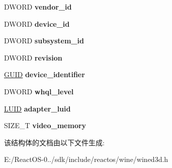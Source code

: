 \begin{DoxyCompactItemize}
D\+W\+O\+RD {\bfseries vendor\+\_\+id}
\item 
\mbox{\label{structwined3d__adapter__identifier_a71bece174e00a4526799496f315d3ec4}} 
D\+W\+O\+RD {\bfseries device\+\_\+id}
\item 
\mbox{\label{structwined3d__adapter__identifier_a318c346b7f25fed53d7fb9df3f8360db}} 
D\+W\+O\+RD {\bfseries subsystem\+\_\+id}
\item 
\mbox{\label{structwined3d__adapter__identifier_a23b2c2e2d8468787402d85a5cbe7528a}} 
D\+W\+O\+RD {\bfseries revision}
\item 
\mbox{\label{structwined3d__adapter__identifier_a7c235a252178acacd7e60780087a8e6c}} 
\hyperlink{interface_g_u_i_d}{G\+U\+ID} {\bfseries device\+\_\+identifier}
\item 
\mbox{\label{structwined3d__adapter__identifier_afbba093b8ffcb9bd786444d5d75ff2e2}} 
D\+W\+O\+RD {\bfseries whql\+\_\+level}
\item 
\mbox{\label{structwined3d__adapter__identifier_a78a8b9287342c268c407a32bc8f8028a}} 
\hyperlink{struct___l_u_i_d}{L\+U\+ID} {\bfseries adapter\+\_\+luid}
\item 
\mbox{\label{structwined3d__adapter__identifier_a92de5a1ba8c5561165215844432b0008}} 
S\+I\+Z\+E\+\_\+T {\bfseries video\+\_\+memory}
\end{DoxyCompactItemize}


该结构体的文档由以下文件生成\+:\begin{DoxyCompactItemize}
\item 
E\+:/\+React\+O\+S-\/0../sdk/include/reactos/wine/wined3d.\+h\end{DoxyCompactItemize}
